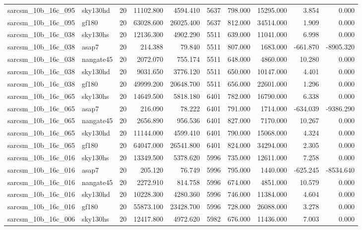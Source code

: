 \documentclass{article}
\begin{document}
\begin{longtable}{llrrrrrrrr}
sarcsm\_10b\_16c\_095 & sky130hd & 20 & 11102.800 & 4594.410 & 5637 & 798.000 & 15295.000 & 3.854 & 0.000 \\
sarcsm\_10b\_16c\_095 & gf180 & 20 & 63028.600 & 26025.400 & 5637 & 812.000 & 34514.000 & 1.909 & 0.000 \\
sarcsm\_10b\_16c\_038 & sky130hs & 20 & 12136.300 & 4902.290 & 5511 & 639.000 & 11041.000 & 6.998 & 0.000 \\
sarcsm\_10b\_16c\_038 & asap7 & 20 & 214.388 & 79.840 & 5511 & 807.000 & 1683.000 & -661.870 & -8905.320 \\
sarcsm\_10b\_16c\_038 & nangate45 & 20 & 2072.070 & 755.174 & 5511 & 648.000 & 4860.000 & 10.280 & 0.000 \\
sarcsm\_10b\_16c\_038 & sky130hd & 20 & 9031.650 & 3776.120 & 5511 & 650.000 & 10147.000 & 4.401 & 0.000 \\
sarcsm\_10b\_16c\_038 & gf180 & 20 & 49999.200 & 20648.700 & 5511 & 656.000 & 22601.000 & 1.296 & 0.000 \\
sarcsm\_10b\_16c\_065 & sky130hs & 20 & 14649.500 & 5818.180 & 6401 & 782.000 & 16790.000 & 6.338 & 0.000 \\
sarcsm\_10b\_16c\_065 & asap7 & 20 & 216.090 & 78.222 & 6401 & 791.000 & 1714.000 & -634.039 & -9386.290 \\
sarcsm\_10b\_16c\_065 & nangate45 & 20 & 2656.890 & 956.536 & 6401 & 827.000 & 7170.000 & 10.267 & 0.000 \\
sarcsm\_10b\_16c\_065 & sky130hd & 20 & 11144.000 & 4599.410 & 6401 & 790.000 & 15068.000 & 4.324 & 0.000 \\
sarcsm\_10b\_16c\_065 & gf180 & 20 & 64047.000 & 26541.800 & 6401 & 824.000 & 34294.000 & 2.305 & 0.000 \\
sarcsm\_10b\_16c\_016 & sky130hs & 20 & 13349.500 & 5378.620 & 5996 & 735.000 & 12611.000 & 7.258 & 0.000 \\
sarcsm\_10b\_16c\_016 & asap7 & 20 & 205.120 & 76.749 & 5996 & 795.000 & 1440.000 & -625.245 & -8534.640 \\
sarcsm\_10b\_16c\_016 & nangate45 & 20 & 2272.910 & 814.758 & 5996 & 674.000 & 4851.000 & 10.579 & 0.000 \\
sarcsm\_10b\_16c\_016 & sky130hd & 20 & 10228.300 & 4280.360 & 5996 & 746.000 & 11384.000 & 4.604 & 0.000 \\
sarcsm\_10b\_16c\_016 & gf180 & 20 & 55873.100 & 23428.700 & 5996 & 728.000 & 26088.000 & 3.278 & 0.000 \\
sarcsm\_10b\_16c\_006 & sky130hs & 20 & 12417.800 & 4972.620 & 5982 & 676.000 & 11436.000 & 7.003 & 0.000 \\

\end{longtable}
\end{document}
